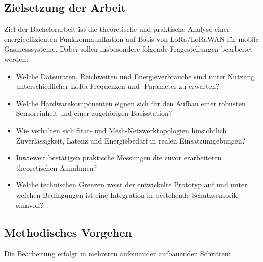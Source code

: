 {      \subsection*{Zielsetzung der Arbeit}

      Ziel der Bachelorarbeit ist die theoretische und praktische Analyse einer energieeffizienten
      Funkkommunikation auf Basis von LoRa/LoRaWAN für mobile Gasmesssysteme. Dabei sollen
      insbesondere folgende Fragestellungen bearbeitet werden:

      \begin{itemize}[noitemsep]
        \item Welche Datenraten, Reichweiten und Energieverbräuche sind unter Nutzung unterschiedlicher LoRa-Frequenzen und -Parameter zu erwarten?
        \item Welche Hardwarekomponenten eignen sich für den Aufbau einer robusten Sensoreinheit und einer zugehörigen Basisstation?
        \item Wie verhalten sich Star- und Mesh-Netzwerktopologien hinsichtlich Zuverlässigkeit, Latenz und Energiebedarf in realen Einsatzumgebungen?
        \item Inwieweit bestätigen praktische Messungen die zuvor erarbeiteten theoretischen Annahmen?
        \item Welche technischen Grenzen weist der entwickelte Prototyp auf und unter welchen Bedingungen ist eine Integration in bestehende Schutzsensorik sinnvoll?
      \end{itemize}

      \subsection*{Methodisches Vorgehen}

      Die Bearbeitung erfolgt in mehreren aufeinander aufbauenden Schritten:

}
